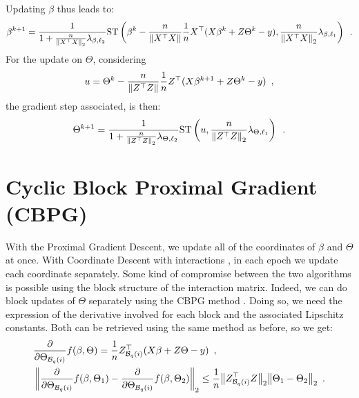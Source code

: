 \documentclass[../main.tex]{subfiles}
\begin{document}
Updating $\beta$ thus leads to:
\begin{align}
	\beta^{k+1} = \frac{1}{1 +
	\frac{n}{\left \lVert  X^\top X \right \rVert_2} \lambda_{\beta, \ell_2}}
	\mathrm{ST}
	\left( \beta^k - \frac{n}{\left \lVert  X^\top X \right \rVert}
		\frac{1}{n} X^\top (X\beta^{k} + Z\Theta^k - y),
		\frac{n}{\left \lVert  X^\top X \right \rVert_2}\lambda_{\beta, \ell_1}
	\right) \enspace.
\end{align}
For the update on $\Theta$, considering
\begin{align*}
u = \Theta^k - \frac{n}{\left \lVert  Z^\top Z \right \rVert} \frac{1}{n} Z^\top (X\beta^{k+1} + Z\Theta^k - y)
\enspace,
\end{align*}
the gradient step associated, is then:
\begin{equation}
	\Theta^{k+1} = \frac{1}{1 + \frac{n}{\left \lVert  Z^\top Z \right \rVert_2}
	\lambda_{\Theta, \ell_2}}\mathrm{ST}
	\left(
		u, \frac{n}{\left \lVert  Z^\top Z \right \rVert_2}\lambda_{\Theta, \ell_1}
	\right) \enspace.
\end{equation}


\section{Cyclic Block Proximal Gradient (CBPG)} \label{sec:CBPG}

With the Proximal Gradient Descent, we update all of the coordinates of
 $\beta$ and $\Theta$ at once.
With Coordinate Descent with interactions \citep{Bascou_Lebre_Salmon20}, in each
epoch we update each coordinate separately.
Some kind of compromise between the two algorithms is possible using the block
structure of the interaction matrix.
Indeed, we can do block updates of $\Theta$ separately using the
CBPG method \citep{massias2019sparse,Beck17}.
Doing so, we need the expression of the derivative involved for
each block and the associated Lipschitz constants.
Both can be retrieved using the same method as before, so we get:
\begin{align}
	&\frac{\partial}{\partial \Theta_{\mathcal{B}_{q}(i)}}f(\beta, \Theta)
	= \frac{1}{n} Z_{\mathcal{B}_{q}(i)}^\top (X\beta + Z\Theta - y)\enspace,\\
	&\left \lVert \frac{\partial}{\partial \Theta_{\mathcal{B}_{q}(i)}}
		f(\beta, \Theta_1) - \frac{\partial}{\partial \Theta_{\mathcal{B}_{q}(i)}}
		f(\beta, \Theta_2) \right \rVert_2
	\leq \frac{1}{n}\big \lVert Z_{\mathcal{B}_{q}(i)}^\top Z \big \rVert_2
		\big \lVert \Theta_1 - \Theta_2 \big \rVert_2\enspace.
\end{align}
\end{document}
